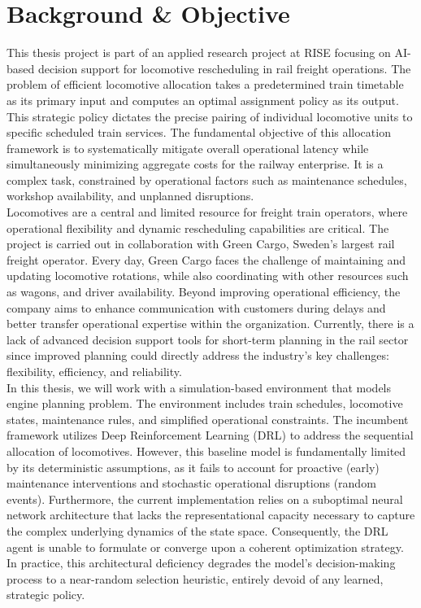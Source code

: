\documentclass[a4paper]{scrartcl}
\begin{document}
\section{Background \& Objective}
This thesis project is part of an applied research project at RISE focusing on AI-based
decision support for locomotive rescheduling in rail freight operations. The problem of efficient locomotive allocation takes a predetermined train timetable as its primary input and computes an optimal assignment policy as its output. This strategic policy dictates the precise pairing of individual locomotive units to specific scheduled train services. The fundamental objective of this allocation framework is to systematically mitigate overall operational latency while simultaneously minimizing aggregate costs for the railway enterprise.
It is a complex task, constrained by operational factors such as maintenance schedules, workshop availability, and unplanned disruptions.\\
Locomotives are a central and limited resource for freight train operators, where operational
flexibility and dynamic rescheduling capabilities are critical. The project is carried out in
collaboration with Green Cargo, Sweden’s largest rail freight operator. Every day, Green
Cargo faces the challenge of maintaining and updating locomotive rotations, while also
coordinating with other resources such as wagons, and driver availability. Beyond improving
operational efficiency, the company aims to enhance communication with customers during
delays and better transfer operational expertise within the organization. Currently, there is a
lack of advanced decision support tools for short-term planning in the rail sector since
improved planning could directly address the industry’s key challenges: flexibility, efficiency,
and reliability.\\
In this thesis, we will work with a simulation-based environment that models engine
planning problem. The environment includes train schedules, locomotive states, maintenance
rules, and simplified operational constraints. The incumbent framework utilizes Deep Reinforcement Learning (DRL) to address the sequential allocation of locomotives. However, this baseline model is fundamentally limited by its deterministic assumptions, as it fails to account for proactive (early) maintenance interventions and stochastic operational disruptions (random events). Furthermore, the current implementation relies on a suboptimal neural network architecture that lacks the representational capacity necessary to capture the complex underlying dynamics of the state space. Consequently, the DRL agent is unable to formulate or converge upon a coherent optimization strategy. In practice, this architectural deficiency degrades the model's decision-making process to a near-random selection heuristic, entirely devoid of any learned, strategic policy.\\
\end{document}
